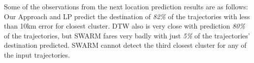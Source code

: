 Some of the observations from the next location prediction results are as follows:\\
Our Approach and LP predict the destination of \emph{82\%} of the trajectories with less than 10km error for closest cluster. 
DTW also is very close with prediction \emph{80\%} of the trajectories, but SWARM fares very badly with just \emph{5\%} of the trajectories' destination predicted. SWARM cannot detect the third closest cluster for any of the input trajectories. 



%
%
%
%
%
%
%
%
%



